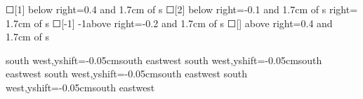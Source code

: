 \begin{scope}[new]
    {☐[1]}
    {}{below right=0.4 and 1.7cm of s}{}
    {☐[2]}
    {}{below right=-0.1 and 1.7cm of s}{}
    {}
    {}{right= 1.7cm of s}{}
    {☐[-1]}
    {-1}{above right=-0.2 and 1.7cm of s}{}
    {☐[]}
    {}{above right=0.4 and 1.7cm of s}{}

    {}{}{}{south west,yshift=-0.05cm}{south east}{west}
    {}{}{}{south west,yshift=-0.05cm}{south east}{west}
    {}{}{}{south west,yshift=-0.05cm}{south east}{west}
    {}{}{}{south west,yshift=-0.05cm}{south east}{west}
\end{scope}

